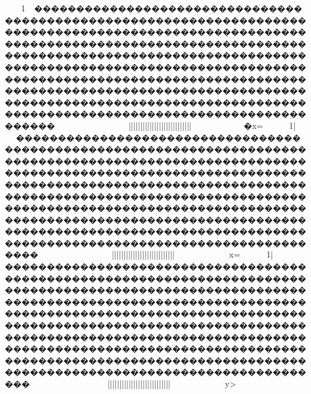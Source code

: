 {{{{{{{{{{{{{{{{{{{{{{{{{{{{{{{{{{{{{{{{{{{{{{{{{{{{{{{{{{{{{{{{{{{{{{{{{{{{{{{{{{{{{{{{{{{{{{{{{{{{{{{{{{{{{{{{{{{{{{{{{{{{{{{{{{{{{{{{{{{{{{{{{{{{{{{{{{{{{{{{{{{{{{{{{{{{{{{{{{{{{{{{{{{{{{{{{{{{{{{{{{{{{{{{{{{{{{{{{{{{{{{{{{{{{{{{{{{{{{{{{{{{{{{{{{{{{{{{{{{{{{{{{{{{{{{{{{{{{{{{{{{{{{{{{{{{{{{{{{{{{{{{{{{{{{{{{{{{{{{{{{{{{{{{{{{{{{{{{{{{{{{{{{{{{{{{{{{{{{{{{{{{{{{{{{{{{{{{{{{{{{{{{{{{{{{{{{{{{{{{{{{{{{{{{{{{{{{{{{{{{{{{{{{{{{{{{{{{{{{{{{{{{{{{{{{{{{{{{{{{{{{{{{{{{{{{{{{{{{{{{{{{{{{{{{{{{{{{{{{{{{{{{{{{{{{{{{{{{{{{{{{{{{{{{{{{{{{{{{{{{{{{{{{{{{{{{{{{{{{{{{{{{{{{{{{{{{{{{{{{{{{{{{{{{{{{{{{{{{{{{{{{{{{{{{{{{{{{{{{{{{{{{{{{{{{{{{{{{{{{{{{{{{{{{{{{{{{{{{{{{{{{{{{{{{{{{{{{{{{{{{{{{{{{{{{{{{{{{{{{{{{{{{{{{{{{{{{{{{{{{{{{{{{{{{{{{{{{{{{{{{{{{{{{{{{{{{{{{{{{{{{{{{{{{{{{{{{{{{{{{{{{{{{{{{{{{{{{{{{{{{{{{{{{{{{{{{{{{{{{{{{{{{{{{{{{{{{{{{{{{{{{{{{{{{{{{{{{{{{{{{{{{{{{{{{{{{{{{{{{{{{{{{1\lx{}~��������������������������������������������������������������������������������������������������������������������������������������������������������������������������������������������������������������������������������������������������������������������������������������������������������������������������������������������������������������������������~~~~~~~~~}~~~~~~~~}}}|||{{{{{{{{{{{{{{||||||||||||||||||||||||}}}}}}}}}}}}}}}}~~~~~~~~�x=
1\kx|~��������������������������������������������������������������������������������������������������������������������������������������������������������������������������������������������������������������������������������������������������������������������������������������������������������������������������������������������������������������������������~~~~~~~~~}~~~~~~~~}}}|||{{{{{{{{{{{{{{||||||||||||||||||||||||}}}}}}}}}}}}}}}}~~~~~~~~x=
1\kx|���������������������������������������������������������������������������������������������������������������������������������������������������������������������������������������������������������������������������������������������������������������������������������������������������������������������������������������������������������������������������~~~~~~~~~~~~~~~~~~}}}|||{{{{{{{{{{{{{{||||||||||||||||||||||||}}}}}}}}}}}}}}}}~~~~~~~~y>
}}}}}}}}}}}}}}}}}}}}}}}}}}}}}}}}}}}}}}}}}}}}}}}}}}}}}}}}}}}}}}}}}}}}}}}}}}}}}}}}}}}}}}}}}}}}}}}}}}}}}}}}}}}}}}}}}}}}}}}}}}}}}}}}}}}}}}}}}}}}}}}}}}}}}}}}}}}}}}}}}}}}}}}}}}}}}}}}}}}}}}}}}}}}}}}}}}}}}}}}}}}}}}}}}}}}}}}}}}}}}}}}}}}}}}}}}}}}}}}}}}}}}}}}}}}}}}}}}}}}}}}}}}}}}}}}}}}}}}}}}}}}}}}}}}}}}}}}}}}}}}}}}}}}}}}}}}}}}}}}}}}}}}}}}}}}}}}}}}}}}}}}}}}}}}}}}}}}}}}}}}}}}}}}}}}}}}}}}}}}}}}}}}}}}}}}}}}}}}}}}}}}}}}}}}}}}}}}}}}}}}}}}}}}}}}}}}}}}}}}}}}}}}}}}}}}}}}}}}}}}}}}}}}}}}}}}}}}}}}}}}}}}}}}}}}}}}}}}}}}}}}}}}}}}}}}}}}}}}}}}}}}}}}}}}}}}}}}}}}}}}}}}}}}}}}}}}}}}}}}}}}}}}}}}}}}}}}}}}}}}}}}}}}}}}}}}}}}}}}}}}}}}}}}}}}}}}}}}}}}}}}}}}}}}}}}}}}}}}}}}}}}}}}}}}}}}}}}}}}}}}}}}}}}}}}}}}}}}}}}}}}}}}}}}}}}}}}}}}}}}}}}}}}}}}}}}}}}}}}}}}}}}}}}}}}}}}}}}}}}}}}}}}}}}}}}}}}}}}}}}}}}}}}}}}}}}}}}}}}}}}}}}}}}}}}}}}}}}}}}}}}}}}}}}}}}}}}}}}}}}}}}}}}}}}}}}}}}}}}}}}}}}}}}}}}}}}}}}}}}}}}}}}}}}
